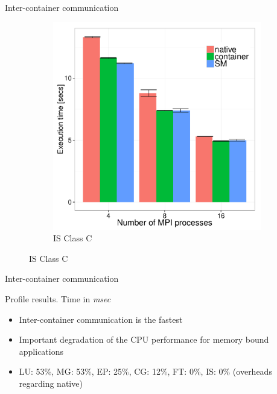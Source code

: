 \documentclass[presentation]{beamer}
\begin{document}
\begin{frame}[label=sec-3-5]{Inter-container communication}
\begin{figure}[H]
\begin{subfigure}[b]{0.42\textwidth}
    \includegraphics[scale=0.25,angle=0]{figures/inter-container-isC.pdf}
    \caption{IS Class C}
  \end{subfigure}
\end{figure}
\end{frame}

\begin{frame}[label=sec-3-6]{Inter-container communication}
\begin{table}
  \scriptsize



\caption{Profile results. Time in \textit{msec}}

\end{table}


\begin{itemize}
\item Inter-container communication is the fastest
\item Important degradation of the CPU performance for memory bound applications
\item LU: 53\%, MG: 53\%, EP: 25\%, CG: 12\%, FT: 0\%, IS: 0\% (overheads regarding native)
\end{itemize}
\end{frame}
\end{document}
